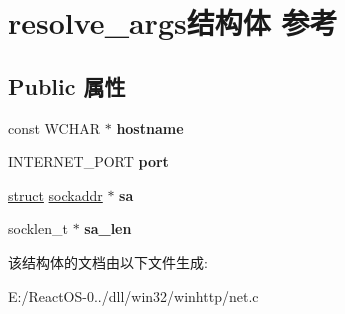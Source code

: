 \hypertarget{structresolve__args}{}\section{resolve\+\_\+args结构体 参考}
\label{structresolve__args}
\subsection*{Public 属性}
\begin{DoxyCompactItemize}
\item 
\mbox{\label{structresolve__args_ad9f0b9746274b05fe1f2cd9adcba2e6f}} 
const W\+C\+H\+AR $\ast$ {\bfseries hostname}
\item 
\mbox{\label{structresolve__args_aa8e6b671bf75ba023c081b9efd406b36}} 
I\+N\+T\+E\+R\+N\+E\+T\+\_\+\+P\+O\+RT {\bfseries port}
\item 
\mbox{\label{structresolve__args_ae961a08983f55113ca478e797c6786ec}} 
\hyperlink{interfacestruct}{struct} \hyperlink{structsockaddr}{sockaddr} $\ast$ {\bfseries sa}
\item 
\mbox{\label{structresolve__args_a1ea3eb45935d27c77e94f2066a776df5}} 
socklen\+\_\+t $\ast$ {\bfseries sa\+\_\+len}
\end{DoxyCompactItemize}


该结构体的文档由以下文件生成\+:\begin{DoxyCompactItemize}
\item 
E\+:/\+React\+O\+S-\/0../dll/win32/winhttp/net.\+c\end{DoxyCompactItemize}
